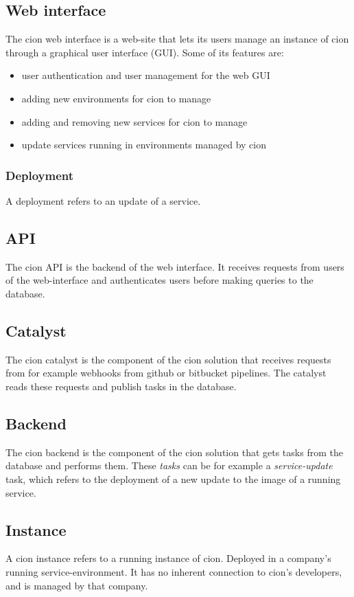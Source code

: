\subsection{Web interface}
The cion web interface is a web-site that lets its users manage an instance of cion through a graphical user interface (GUI). Some of its features are:
\begin{itemize}
    \item user authentication and user management for the web GUI
    \item adding new environments for cion to manage
    \item adding and removing new services for cion to manage
    \item update services running in environments managed by cion
\end{itemize}

\subsubsection{Deployment}
A deployment refers to an update of a service. 


\subsection{API}
The cion API is the backend of the web interface. It receives requests from users of the web-interface and authenticates users before making queries to the database.


\subsection{Catalyst}
The cion catalyst is the component of the cion solution that receives requests from for example webhooks from github or bitbucket pipelines. The catalyst reads these requests and publish tasks in the database. 

\subsection{Backend}
The cion backend is the component of the cion solution that gets tasks from the database and performs them. These \textit{tasks} can be for example a \textit{service-update} task, which refers to the deployment of a new update to the image of a running service.

\subsection{Instance}
A cion instance refers to a running instance of cion. Deployed in a company's running service-environment. It has no inherent connection to cion's developers, and is managed by that company.

\newpage
\printindex